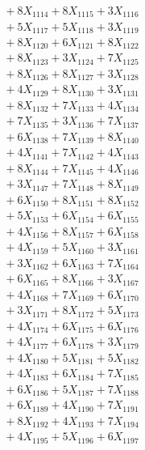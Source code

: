 \documentclass[a4paper,10pt]{article}
\begin{document}
{\begin{align}
&\;  + 8 X_{1114} + 8 X_{1115} + 3 X_{1116} \\[0.3ex]
&\;  + 5 X_{1117} + 5 X_{1118} + 3 X_{1119} \\[0.5ex]\allowbreak
&\;  + 8 X_{1120} + 6 X_{1121} + 8 X_{1122} \\[0.3ex]
&\;  + 8 X_{1123} + 3 X_{1124} + 7 X_{1125} \\[0.3ex]
&\;  + 8 X_{1126} + 8 X_{1127} + 3 X_{1128} \\[0.3ex]
&\;  + 4 X_{1129} + 8 X_{1130} + 3 X_{1131} \\[0.3ex]
&\;  + 8 X_{1132} + 7 X_{1133} + 4 X_{1134} \\[0.3ex]
&\;  + 7 X_{1135} + 3 X_{1136} + 7 X_{1137} \\[0.3ex]
&\;  + 6 X_{1138} + 7 X_{1139} + 8 X_{1140} \\[0.3ex]
&\;  + 4 X_{1141} + 7 X_{1142} + 4 X_{1143} \\[0.3ex]
&\;  + 8 X_{1144} + 7 X_{1145} + 4 X_{1146} \\[0.3ex]
&\;  + 3 X_{1147} + 7 X_{1148} + 8 X_{1149} \\[0.5ex]\allowbreak
&\;  + 6 X_{1150} + 8 X_{1151} + 8 X_{1152} \\[0.3ex]
&\;  + 5 X_{1153} + 6 X_{1154} + 6 X_{1155} \\[0.3ex]
&\;  + 4 X_{1156} + 8 X_{1157} + 6 X_{1158} \\[0.3ex]
&\;  + 4 X_{1159} + 5 X_{1160} + 3 X_{1161} \\[0.3ex]
&\;  + 3 X_{1162} + 6 X_{1163} + 7 X_{1164} \\[0.3ex]
&\;  + 6 X_{1165} + 8 X_{1166} + 3 X_{1167} \\[0.3ex]
&\;  + 4 X_{1168} + 7 X_{1169} + 6 X_{1170} \\[0.3ex]
&\;  + 3 X_{1171} + 8 X_{1172} + 5 X_{1173} \\[0.3ex]
&\;  + 4 X_{1174} + 6 X_{1175} + 6 X_{1176} \\[0.3ex]
&\;  + 4 X_{1177} + 6 X_{1178} + 3 X_{1179} \\[0.5ex]\allowbreak
&\;  + 4 X_{1180} + 5 X_{1181} + 5 X_{1182} \\[0.3ex]
&\;  + 4 X_{1183} + 6 X_{1184} + 7 X_{1185} \\[0.3ex]
&\;  + 6 X_{1186} + 5 X_{1187} + 7 X_{1188} \\[0.3ex]
&\;  + 6 X_{1189} + 4 X_{1190} + 7 X_{1191} \\[0.3ex]
&\;  + 8 X_{1192} + 4 X_{1193} + 7 X_{1194} \\[0.3ex]
&\;  + 4 X_{1195} + 5 X_{1196} + 6 X_{1197} \\[0.3ex]

\end{align}}
\end{document}
